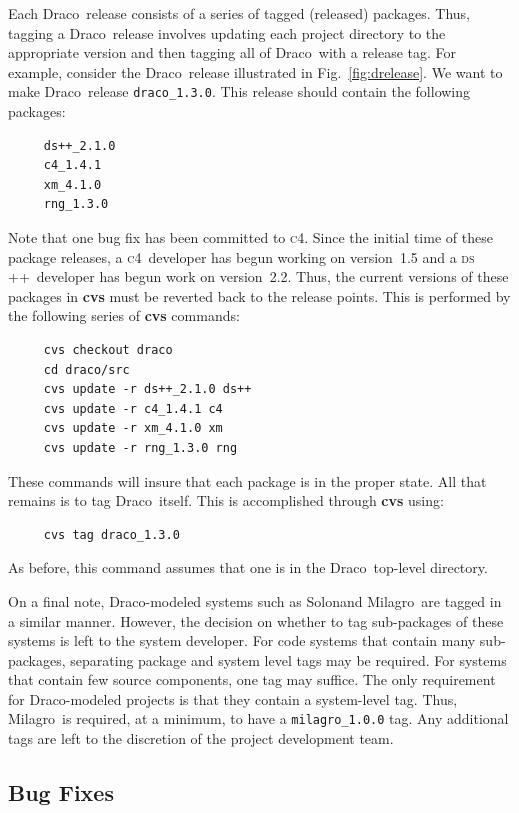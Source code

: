 \documentclass[11pt]{nmemo}
\newcommand{\draco}{{\normalfont\normalsize\textsf Draco}}
\newcommand{\milagro}{{\normalfont\normalsize\textsf Milagro}}
\newcommand{\solon}{{\normalfont\normalsize\textsf Solon}}
\newcommand{\cfour}{{\normalfont\normalsize\scshape c\small 4}}
\newcommand{\dsxx}{{\normalfont\normalsize\scshape ds\raisebox{.2ex}
  {\scriptsize ++}}}
\begin{document}
Each \draco\ release consists of a series of tagged (released)
packages.  Thus, tagging a \draco\ release involves updating each
project directory to the appropriate version and then tagging all of
\draco\ with a release tag.  For example, consider the \draco\ release 
illustrated in Fig.~\ref{fig:drelease}.  We want to make \draco\
release \texttt{draco\_1.3.0}.  This release should contain the
following packages:
\begin{verbatim}
     ds++_2.1.0
     c4_1.4.1
     xm_4.1.0
     rng_1.3.0
\end{verbatim}
Note that one bug fix has been committed to \cfour.  Since the initial
time of these package releases, a \cfour\ developer has begun working
on version~1.5 and a \dsxx\ developer has begun work on version~2.2.
Thus, the current versions of these packages in {\bf cvs} must be
reverted back to the release points. This is performed by the
following series of {\bf cvs} commands:
\begin{verbatim}
     cvs checkout draco
     cd draco/src
     cvs update -r ds++_2.1.0 ds++
     cvs update -r c4_1.4.1 c4
     cvs update -r xm_4.1.0 xm
     cvs update -r rng_1.3.0 rng
\end{verbatim}
These commands will insure that each package is in the proper state.
All that remains is to tag \draco\ itself.  This is accomplished
through {\bf cvs} using:
\begin{verbatim}
     cvs tag draco_1.3.0
\end{verbatim}
As before, this command assumes that one is in the \draco\ top-level
directory.  

On a final note, \draco-modeled systems such as \solon and \milagro\
are tagged in a similar manner.  However, the decision on whether to
tag sub-packages of these systems is left to the system developer.
For code systems that contain many sub-packages, separating package
and system level tags may be required.  For systems that contain few
source components, one tag may suffice.  The only requirement for
\draco-modeled projects is that they contain a system-level tag.
Thus, \milagro\ is required, at a minimum, to have a
\texttt{milagro\_1.0.0} tag.  Any additional tags are left to the
discretion of the project development team.

\subsection{Bug Fixes}
\end{document}
